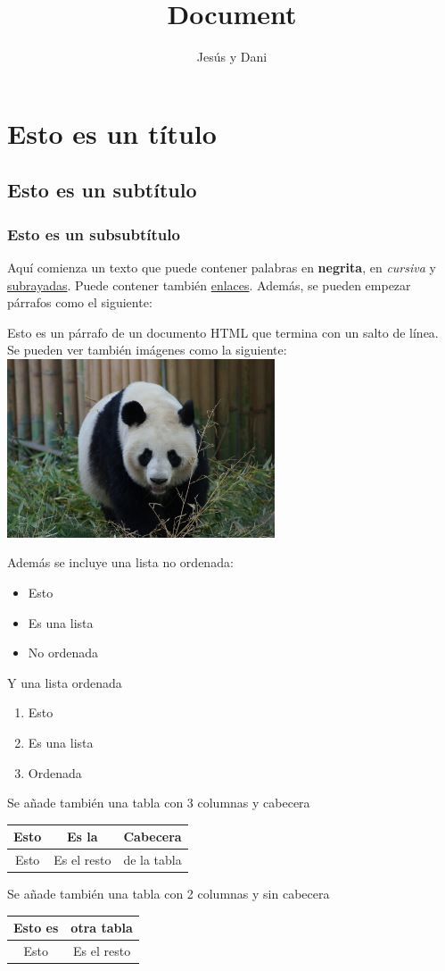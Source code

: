 \documentclass[12pt]{article}
\title{Document}
\author{Jesús y Dani}
\begin{document}
\section{Esto es un título}
\subsection{Esto es un subtítulo}
\subsubsection{Esto es un subsubtítulo}

Aquí comienza un texto que puede contener palabras en \textbf{negrita}, en \textit{cursiva} y \underline{subrayadas}. 
Puede contener también \href{https://ejemplo.com"}{enlaces}.
Además, se pueden empezar párrafos como el siguiente:

Esto es un párrafo de un documento HTML que termina con un salto de línea.\\

Se pueden ver también imágenes como la siguiente:\\


\includegraphics[width=300px, height=200px]{image.png}

Además se incluye una lista no ordenada:
\begin{itemize}
	\item Esto
	\item Es una lista
	\item No ordenada
\end{itemize}


Y una lista ordenada
\begin{enumerate}
	\item Esto
	\item Es una lista
	\item Ordenada
\end{enumerate}


Se añade también una tabla con 3 columnas y cabecera

\begin{tabular}{|c|c|c|}
	\hline
	\textbf{Esto} & \textbf{Es la} & \textbf{Cabecera} \\
	\hline
	Esto & Es el resto & de la tabla \\
	\hline
\end{tabular}


Se añade también una tabla con 2 columnas y sin cabecera 

\begin{tabular}{|c|c|}
	\hline
	Esto es & otra tabla \\
	\hline
	Esto & Es el resto \\
	\hline
\end{tabular}
\end{document}
